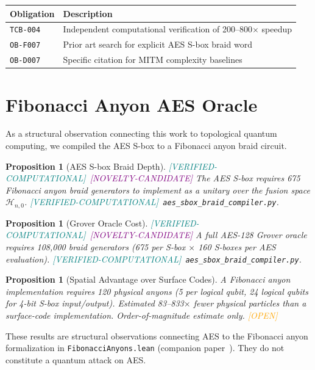 \documentclass[11pt,letterpaper]{article}
\newtheorem{proposition}[theorem]{Proposition}
\newcommand{\VC}{\textcolor{teal}{[VERIFIED-COMPUTATIONAL]}}
\newcommand{\OP}{\textcolor{orange}{[OPEN]}}
\newcommand{\CN}{\textcolor{purple}{[NOVELTY-CANDIDATE]}}
\begin{document}
\begin{center}
\begin{tabular}{ll}
\toprule
Obligation & Description \\
\midrule
\texttt{TCB-004} & Independent computational verification of 200--800$\times$ speedup \\
\texttt{OB-F007} & Prior art search for explicit AES S-box braid word \\
\texttt{OB-D007} & Specific citation for MITM complexity baselines \\
\bottomrule
\end{tabular}
\end{center}

\section{Fibonacci Anyon AES Oracle}
\label{sec:anyon}

As a structural observation connecting this work to topological quantum
computing, we compiled the AES S-box to a Fibonacci anyon braid circuit.

\begin{proposition}[AES S-box Braid Depth] \VC\ \CN
The AES S-box requires 675 Fibonacci anyon braid generators to implement
as a unitary over the fusion space $\mathcal{H}_{n,0}$.
\VC\ \texttt{aes\_sbox\_braid\_compiler.py}.
\end{proposition}

\begin{proposition}[Grover Oracle Cost] \VC\ \CN
A full AES-128 Grover oracle requires 108,000 braid generators
(675 per S-box $\times$ 160 S-boxes per AES evaluation).
\VC\ \texttt{aes\_sbox\_braid\_compiler.py}.
\end{proposition}

\begin{proposition}[Spatial Advantage over Surface Codes]
A Fibonacci anyon implementation requires 120 physical anyons
(5 per logical qubit, 24 logical qubits for 4-bit S-box input/output).
Estimated 83--833$\times$ fewer physical particles than a surface-code
implementation.  \textit{Order-of-magnitude estimate only.} \OP
\end{proposition}

These results are structural observations connecting AES to the Fibonacci
anyon formalization in \texttt{FibonacciAnyons.lean} (companion paper~\cite{parr2026foundations}).
They do not constitute a quantum attack on AES.
\end{document}
